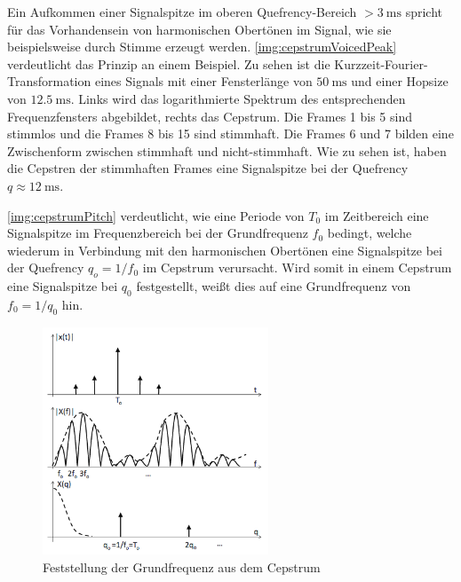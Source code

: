 Ein Aufkommen einer Signalspitze im oberen Quefrency-Bereich $> \SI{3}{\milli\second}$ spricht für das Vorhandensein von harmonischen Obertönen im Signal, wie sie beispielsweise durch Stimme erzeugt werden. \autoref{img:cepstrumVoicedPeak} verdeutlicht das Prinzip an einem Beispiel. Zu sehen ist die Kurzzeit-Fourier-Transformation eines Signals mit einer Fensterlänge von $\SI{50}{\milli\second}$ und einer Hopsize von $\SI{12.5}{\milli\second}$. Links wird das logarithmierte Spektrum des entsprechenden Frequenzfensters abgebildet, rechts das Cepstrum. Die Frames 1 bis 5 sind stimmlos und die Frames 8 bis 15 sind stimmhaft. Die Frames 6 und 7 bilden eine Zwischenform zwischen stimmhaft und nicht-stimmhaft. Wie zu sehen ist, haben die Cepstren der stimmhaften Frames eine Signalspitze bei der Quefrency $q \approx \SI{12}{\milli\second}$.\cite[\emph{Cepstral Analysis}, S. 16]{ricardo_ceps}

\autoref{img:cepstrumPitch} verdeutlicht, wie eine Periode von $T_0$ im Zeitbereich eine Signalspitze im Frequenzbereich bei der Grundfrequenz $f_0$ bedingt, welche wiederum in Verbindung mit den harmonischen Obertönen eine Signalspitze bei der Quefrency $q_o = 1 / f_0$ im Cepstrum verursacht. Wird somit in einem Cepstrum eine Signalspitze bei $q_0$ festgestellt, weißt dies auf eine Grundfrequenz von $f_0 = 1/q_0$ hin. \cite[S. 5]{cepstrumPitchTranslation}

\begin{figure}[h]
	\centering
	\includegraphics[width=0.6\textwidth]{bilder/cepstrumPitch.png}
	\caption[Feststellung der Grundfrequenz aus dem Cepstrum]{Feststellung der Grundfrequenz aus dem Cepstrum \cite[S. 5]{cepstrumPitchTranslation}}
	\label{img:cepstrumPitch}
\end{figure}


